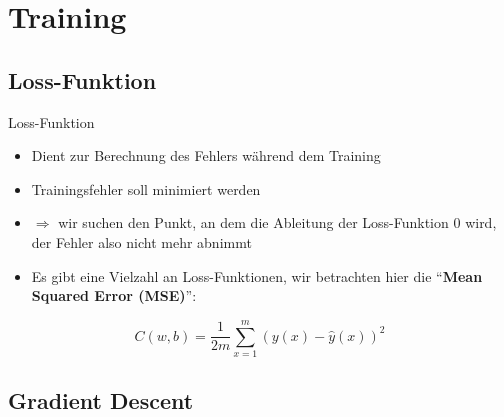 \section{Training}%
\label{sec:train}

\subsection{Loss-Funktion}%
\label{sec:loss}

\begin{frame}{Loss-Funktion}
  \begin{itemize}
  \item Dient zur Berechnung des Fehlers während dem Training
  \item Trainingsfehler soll minimiert werden
  \item \(\Rightarrow\) wir suchen den Punkt, an dem die Ableitung der
    Loss-Funktion \(0\) wird, der Fehler also nicht mehr abnimmt
  \item Es gibt eine Vielzahl an Loss-Funktionen, wir betrachten hier
    die \enquote{\textbf{Mean Squared Error (MSE)}}:
  \end{itemize}

  \vspace{.6cm}

  \begin{minipage}{.4\linewidth}
    \[C(w, b) = \frac{1}{2m} \sum_{x=1}^{m} (y(x) - \hat{y}(x))^2\]
  \end{minipage}\hfill%
  \begin{minipage}{.55\linewidth}
  \end{minipage}
\end{frame}

\subsection{Gradient Descent}%
\label{sec:graddesc}

